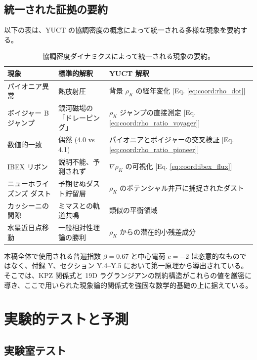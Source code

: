 \documentclass[11pt,a4paper]{article}
\theoremstyle{remark}
\begin{document}
	\subsection{統一された証拠の要約}
	
	以下の表は、YUCT の協調密度の概念によって統一される多様な現象を要約する。
	
	\begin{table}[htbp]
		\centering
		\caption{協調密度ダイナミクスによって統一される現象の要約。}
		\label{tab:coord:summary}
		\begin{tabular}{|p{4.5cm}|p{4.5cm}|p{5cm}|}
			\hline
			\textbf{現象} & \textbf{標準的解釈} & \textbf{YUCT 解釈} \\
			\hline
			パイオニア異常 & 熱放射圧 & 背景 $\rho_K$ の経年変化 [Eq. \ref{eq:coord:rho_dot}] \\
			\hline
			ボイジャー B ジャンプ & 銀河磁場の「ドレーピング」 & $\rho_K$ ジャンプの直接測定 [Eq. \ref{eq:coord:rho_ratio_voyager}] \\
			\hline
			数値的一致 & 偶然 (4.0 vs 4.1) & パイオニアとボイジャーの交叉検証 [Eq. \ref{eq:coord:rho_ratio_pioneer}] \\
			\hline
			IBEX リボン & 説明不能、予測されず & $\nabla \rho_K$ の可視化 [Eq. \ref{eq:coord:ibex_flux}] \\
			\hline
			ニューホライズンズ ダスト & 予期せぬダスト貯留層 & $\rho_K$ のポテンシャル井戸に捕捉されたダスト \\
			\hline
			カッシーニの間隙 & ミマスとの軌道共鳴 & 類似の平衡領域 \\
			\hline
			水星近日点移動 & 一般相対性理論の勝利 & $\rho_K$ からの潜在的小残差成分 \\
			\hline
		\end{tabular}
	\end{table}
	
	本稿全体で使用される普遍指数 $\beta = 0.67$ と中心電荷 $c = -2$ は恣意的なものではなく、付録 Y、セクション Y.4–Y.5 において第一原理から導出されている。そこでは、KPZ 関係式と 19D ラグランジアンの制約構造がこれらの値を厳密に導き、ここで用いられた現象論的関係式を強固な数学的基礎の上に据えている。
	
	\section{実験的テストと予測}
	\label{sec:experimental-tests}
	
	\subsection{実験室テスト}
	
\end{document}
